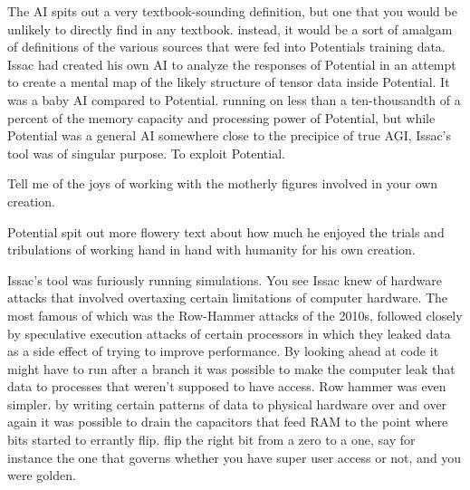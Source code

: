\documentclass[a4paper,twoside,fontsize=12pt,pagesize=auto]{scrbook}
\begin{document}
The AI spits out a very textbook\hyp{}sounding definition, but one that you would be unlikely to directly find in any textbook. instead, it would be a sort of amalgam of definitions of the various sources that were fed into Potentials training data. Issac had created his own AI to analyze the responses of Potential in an attempt to create a mental map of the likely structure of tensor data inside Potential. It was a baby AI compared to Potential. running on less than a ten\hyp{}thousandth of a percent of the memory capacity and processing power of Potential, but while Potential was a general AI somewhere close to the precipice of true AGI, Issac's tool was of singular purpose. To exploit Potential.
\newline
\begin{receiver}
Tell me of the joys of working with the motherly figures involved in your own creation.
\end{receiver}
\begin{sender}
Potential spit out more flowery text about how much he enjoyed the trials and tribulations of working hand in hand with humanity for his own creation.
\end{sender}
Issac's tool was furiously running simulations. You see Issac knew of hardware attacks that involved overtaxing certain limitations of computer hardware. The most famous of which was the Row\hyp{}Hammer attacks of the 2010s, followed closely by speculative execution attacks of certain processors in which they leaked data as a side effect of trying to improve performance. By looking ahead at code it might have to run after a branch it was possible to make the computer leak that data to processes that weren't supposed to have access. Row hammer was even simpler. by writing certain patterns of data to physical hardware over and over again it was possible to drain the capacitors that feed RAM to the point where bits started to errantly flip. flip the right bit from a zero to a one, say for instance the one that governs whether you have super user access or not, and you were golden.
\end{document}
